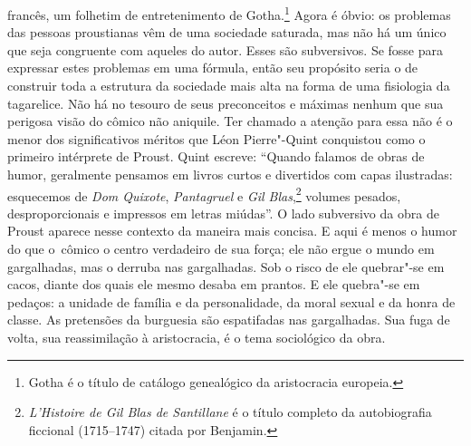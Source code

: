 francês, um folhetim de entretenimento de Gotha.\footnote{Gotha é o
  título de catálogo genealógico da aristocracia europeia. \versal{[N.~O.]}} Agora é
óbvio: os problemas das pessoas proustianas vêm de uma sociedade
saturada, mas não há um único que seja congruente com aqueles do autor.
Esses são subversivos. Se fosse para expressar estes problemas em uma
fórmula, então seu propósito seria o de construir toda a estrutura da
sociedade mais alta na forma de uma fisiologia da tagarelice. Não há no
tesouro de seus preconceitos e máximas nenhum que sua perigosa visão do
cômico não aniquile. Ter chamado a atenção para essa não é o menor dos
significativos méritos que Léon Pierre"-Quint conquistou como o primeiro
intérprete de Proust. Quint escreve: ``Quando falamos de obras de humor,
geralmente pensamos em livros curtos e divertidos com capas ilustradas:
esquecemos de \emph{Dom Quixote}, \emph{Pantagruel} e \emph{Gil Blas},\footnote{\emph{L'Histoire de Gil Blas de Santillane} é o título completo da
  autobiografia ficcional (1715--1747) citada por Benjamin. \versal{[N.~T.]}} volumes
pesados, desproporcionais e impressos em letras miúdas''. O lado
subversivo da obra de Proust aparece nesse contexto da maneira mais
concisa. E aqui é menos o humor do que o~cômico o centro verdadeiro de
sua força; ele não ergue o mundo em gargalhadas, mas o derruba nas
gargalhadas. Sob o risco de ele quebrar"-se em cacos, diante dos quais
ele mesmo desaba em prantos. E ele quebra"-se em pedaços: a unidade de
família e da personalidade, da moral sexual e da honra de classe. As
pretensões da burguesia são espatifadas nas gargalhadas. Sua fuga de
volta, sua reassimilação à aristocracia, é o tema sociológico da obra.

